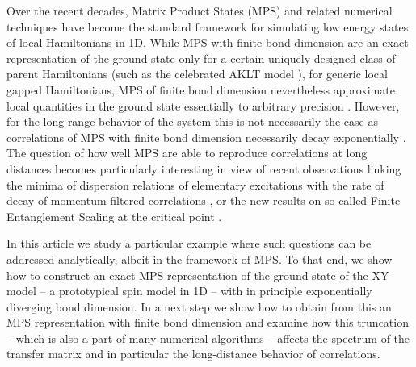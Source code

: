 \documentclass[prl,twocolumn,showpacs,floatfix,superscriptaddress,nofootinbib]{revtex4-1}
\begin{document}

Over the recent decades, Matrix Product States (MPS) \cite{Fannes1992,Verstraete2008,Schollwock2011} and related numerical techniques have become the standard framework for simulating low energy states of local Hamiltonians in 1D. 
While MPS with finite bond dimension are an exact representation of the ground state only for a certain uniquely designed class of parent Hamiltonians (such as the celebrated AKLT model \cite{AKLT1987}), for generic local gapped Hamiltonians, MPS of finite bond dimension nevertheless approximate local quantities in the ground state essentially to arbitrary precision \cite{Verstraete2006}. 
However, for the long-range behavior of the system this is not necessarily the case as correlations of MPS with finite bond dimension necessarily decay exponentially \cite{Fannes1992}. 
The question of how well MPS are able to reproduce correlations at long distances becomes particularly interesting in view of recent observations linking the minima of dispersion relations of elementary excitations with the rate of decay of momentum-filtered correlations \cite{Zauner2014,Haegeman2014}, or the new results on so called Finite Entanglement Scaling at the critical point \cite{Tagliacozzo2008,Pollmann2009,Vid2014}.

In this article we study a particular example where such questions can be addressed analytically, albeit in the framework of MPS. 
To that end, we show how to construct an exact MPS representation of the ground state of the XY model -- a prototypical spin model in 1D -- with in principle exponentially diverging bond dimension. 
In a next step we show how to obtain from this an MPS representation with finite bond dimension and examine how this truncation -- which is also a part of many numerical algorithms -- affects the spectrum of the transfer matrix and in particular the long-distance behavior of correlations.

\end{document}
